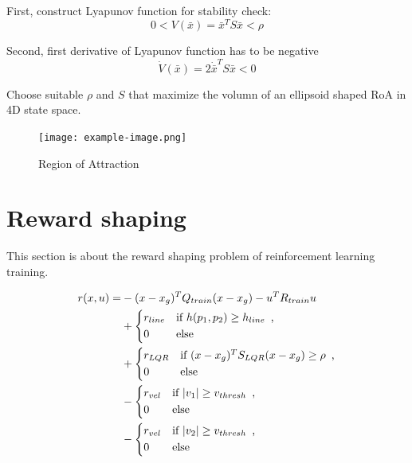 First, construct Lyapunov function for stability check:
\begin{equation}
    0< V(\bar{x}) = \bar{x}^T S \bar{x} < \rho
\end{equation}

Second, first derivative of Lyapunov function has to be negative
\begin{equation}
    \dot{V}(\bar{x}) = 2\dot{\bar{x}}^T S \bar{x} < 0
\end{equation}

Choose suitable \(\rho\) and \(S\) that maximize the volumn of an ellipsoid shaped RoA in 4D state space.

\begin{figure}[htbp]
    \centering
    \texttt{[image: example-image.png]} %
    \caption{Region of Attraction}
    \label{fig:example}
\end{figure}

\section{Reward shaping}
This section is about the reward shaping problem of reinforcement learning training.

\begin{equation}
\begin{aligned}
 r(x,u) = &-(x - x_g)^T Q_{train} (x - x_g) - u^T R_{train}u \nonumber\\
           & +
            \begin{dcases*}
              r_{line} & \text{if} $h(p_1, p_2) \geq h_{line}$\, ,\\
              0 & \text{else}
            \end{dcases*}\nonumber\\
           & +
            \begin{dcases*}
              r_{LQR} & \text{if} $(x - x_g)^T S_{LQR} (x - x_g) \geq \rho $\, ,\\
              0 & \text{else}
            \end{dcases*}\nonumber\\
           & -
            \begin{dcases*}
              r_{vel} & \text{if} $|v_1| \geq v_{thresh}$\, ,\\
              0 & \text{else}
            \end{dcases*}\nonumber\\
           & -
            \begin{dcases*}
              r_{vel} & \text{if} $|v_2| \geq v_{thresh}$\, ,\\
              0 & \text{else}
            \end{dcases*}
\end{aligned}
\end{equation}


